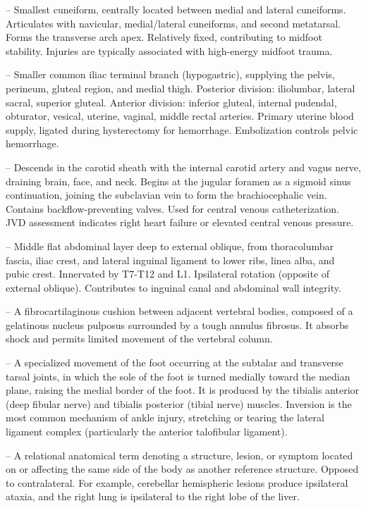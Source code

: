 -- Smallest cuneiform, centrally located between medial and lateral cuneiforms. Articulates with navicular, medial/lateral cuneiforms, and second metatarsal. Forms the transverse arch apex. Relatively fixed, contributing to midfoot stability. Injuries are typically associated with high-energy midfoot trauma.

-- Smaller common iliac terminal branch (hypogastric), supplying the pelvis, perineum, gluteal region, and medial thigh. Posterior division: iliolumbar, lateral sacral, superior gluteal. Anterior division: inferior gluteal, internal pudendal, obturator, vesical, uterine, vaginal, middle rectal arteries. Primary uterine blood supply, ligated during hysterectomy for hemorrhage. Embolization controls pelvic hemorrhage.

-- Descends in the carotid sheath with the internal carotid artery and vagus nerve, draining brain, face, and neck. Begins at the jugular foramen as a sigmoid sinus continuation, joining the subclavian vein to form the brachiocephalic vein. Contains backflow-preventing valves. Used for central venous catheterization. JVD assessment indicates right heart failure or elevated central venous pressure.

-- Middle flat abdominal layer deep to external oblique, from thoracolumbar fascia, iliac crest, and lateral inguinal ligament to lower ribs, linea alba, and pubic crest. Innervated by T7-T12 and L1. Ipsilateral rotation (opposite of external oblique). Contributes to inguinal canal and abdominal wall integrity.

-- A fibrocartilaginous cushion between adjacent vertebral bodies, composed of a gelatinous nucleus pulposus surrounded by a tough annulus fibrosus. It absorbs shock and permits limited movement of the vertebral column.

-- A specialized movement of the foot occurring at the subtalar and transverse tarsal joints, in which the sole of the foot is turned medially toward the median plane, raising the medial border of the foot. It is produced by the tibialis anterior (deep fibular nerve) and tibialis posterior (tibial nerve) muscles. Inversion is the most common mechanism of ankle injury, stretching or tearing the lateral ligament complex (particularly the anterior talofibular ligament).

-- A relational anatomical term denoting a structure, lesion, or symptom located on or affecting the same side of the body as another reference structure. Opposed to contralateral. For example, cerebellar hemispheric lesions produce ipsilateral ataxia, and the right lung is ipsilateral to the right lobe of the liver.

